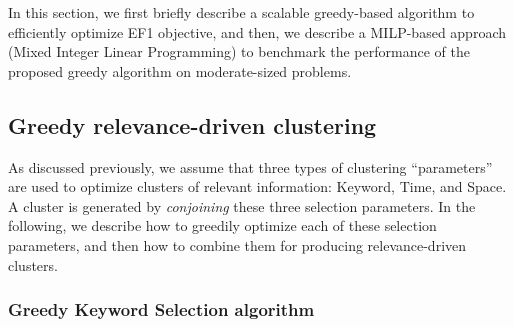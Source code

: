 In this section, we  first briefly describe a scalable greedy-based algorithm to efficiently optimize EF1 objective, and then, we describe a MILP-based approach (Mixed Integer Linear Programming) to benchmark the performance of the proposed greedy algorithm on moderate-sized problems.


\subsection{Greedy relevance-driven clustering}


As discussed previously, we assume that three types of clustering ``parameters'' are used to optimize clusters of relevant information: Keyword, Time, and Space.  A cluster is generated by \emph{conjoining} these three selection parameters. In the following, we describe how to greedily optimize each of these selection parameters, and then how to combine them for producing relevance-driven clusters.

\subsubsection{Greedy Keyword Selection algorithm}

